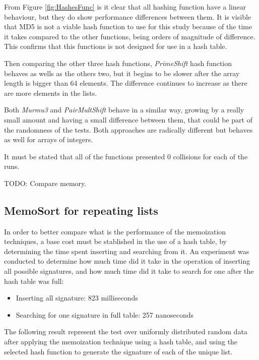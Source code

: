 \documentclass[a4paper,12pt]{article}
\begin{document}
From Figure \ref{fig:HashesFunc} is it clear that all hashing function have a linear behaviour, but they do show performance differences between them. It is visible that MD5 is not a viable hash function to use for this study because of the time it takes compared to the other functions, being orders of magnitude of difference. This confirms that this functions is not designed for use in a hash table.

Then comparing the other three hash functions, {\it PrimeShift} hash function behaves as wells as the others two, but it begins to be slower after the array length is bigger than 64 elements. The difference continues to increase as there are more elements in the lists.

Both {\it Murmu3} and {\it PairMultShift} behave in a similar way, growing by a really small amount and having a small difference between them, that could be part of the randomness of the tests. Both approaches are radically different but behaves as well for arrays of integers.

It must be stated that all of the functions presented 0 collisions for each of the runs.

TODO: Compare memory.


\subsection{MemoSort for repeating lists}

In order to better compare what is the performance of the memoization techniques, a base cost must be stablished in the use of a hash table, by determining the time spent inserting and searching from it. An experiment was conducted to determine how much time did it take in the operation of inserting all possible signatures, and how much time did it take to search for one after the hash table was full:

\begin{itemize}
\item Inserting all signature: 823 milliseconds
\item Searching for one signature in full table: 257 nanoseconds
\end{itemize}

The following result represent the test over uniformly distributed random data after applying the memoization technique using a hash table, and using the selected hash function to generate the signature of each of the unique list. \\
\end{document}
